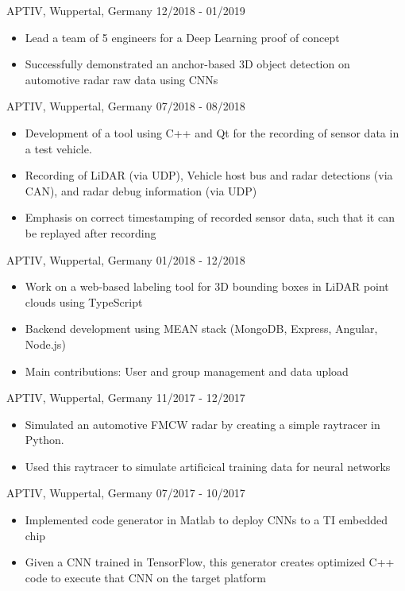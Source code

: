 \documentclass[singlesided,
               paper=a4,
               fontsize=10pt
              ]{my-resume}
\begin{document}
%
    {APTIV, Wuppertal, Germany}
    {12/2018 - 01/2019}
    {\begin{itemize}[leftmargin=2em]
        \item Lead a team of 5 engineers for a Deep Learning proof of concept
        \item Successfully demonstrated an anchor-based 3D object detection on automotive radar raw data using CNNs
    \end{itemize}}
%
\clearpage
\pagestyle{empty}
%
    {APTIV, Wuppertal, Germany}
    {07/2018 - 08/2018}
    {\begin{itemize}[leftmargin=2em]
        \item Development of a tool using C++ and Qt for the recording of sensor data in a test vehicle.
        \item Recording of LiDAR (via UDP), Vehicle host bus and radar detections (via CAN), and radar debug information (via UDP)
        \item Emphasis on correct timestamping of recorded sensor data, such that it can be replayed after recording 
    \end{itemize}}
%
    {APTIV, Wuppertal, Germany}
    {01/2018 - 12/2018}
    {\begin{itemize}[leftmargin=2em]
        \item Work on a web-based labeling tool for 3D bounding boxes in LiDAR point clouds using TypeScript
        \item Backend development using MEAN stack (MongoDB, Express, Angular, Node.js)
        \item Main contributions: User and group management and data upload
    \end{itemize}}
%
    {APTIV, Wuppertal, Germany}
    {11/2017 - 12/2017}
    {\begin{itemize}[leftmargin=2em]
        \item Simulated an automotive FMCW radar by creating a simple raytracer in Python.
        \item Used this raytracer to simulate artificical training data for neural networks 
    \end{itemize}}
%
    {APTIV, Wuppertal, Germany}
    {07/2017 - 10/2017}
    {\begin{itemize}[leftmargin=2em]
        \item Implemented code generator in Matlab to deploy CNNs to a TI embedded chip
        \item Given a CNN trained in TensorFlow, this generator creates optimized C++ code to execute that CNN on the target platform 
    \end{itemize}}
\end{document}
